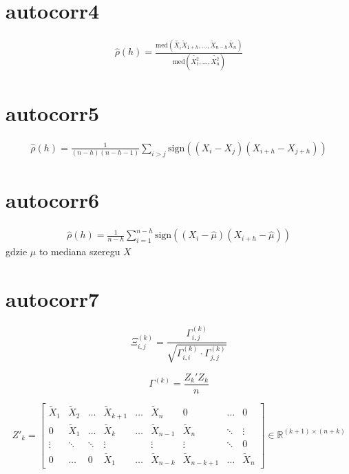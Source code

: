 \documentclass[12pt]{mwart}
\begin{document}
\section{autocorr4}
\begin{gather}
	\hat{\rho}(h)=\frac{\text{med}{\left(\tilde{X_i}\tilde{X}_{1+h},\dots, \tilde{X}_{n-h}\tilde{X_n}\right)}}{\text{med}{\left(\tilde{X_1^2},\dots, \tilde{X_n^2}\right)}}
\end{gather}
\section{autocorr5}
\begin{gather}
	\hat{\rho}(h)=\frac{1}{(n-h)(n-h-1)}\displaystyle{\sum_{i>j}\text{sign}((X_i-X_j)(X_{i+h}-X_{j+h}))}
\end{gather}
\section{autocorr6}
\begin{gather}
	\hat{\rho}(h)=\frac{1}{n-h}\displaystyle{\sum_{i=1}^{n-h}\text{sign}((X_i-\hat\mu)(X_{i+h} - \hat\mu))}
\end{gather}
gdzie $\hat\mu$ to mediana szeregu $X$
\section{autocorr7}
\begin{equation}
	\Xi_{i, j}^{(k)}=\frac{\Gamma_{i, j}^{(k)}}{\sqrt{\Gamma_{i, i}^{(k)}\cdot\Gamma_{j, j}^{(k)}}}
\end{equation}

\begin{equation}
	\Gamma^{(k)}=\frac{Z_k'Z_k}{n}
\end{equation}

\begin{equation}
	Z'_k = \begin{bmatrix}
		\tilde X_1 & \tilde X_2 & \hdots & \tilde X_{k+1}& \hdots & \tilde X_n & 0 & \hdots & 0 \\
		0 & \tilde X_1 & \hdots & \tilde X_k & \hdots &\tilde X_{n-1} & \tilde X_n & \ddots & \vdots \\
		\vdots & \ddots & \ddots & \vdots & & \vdots & \vdots & \ddots & 0 \\
		0 & \hdots & 0 & \tilde X_1 & \hdots &\tilde X_{n-k} & \tilde X_{n-k+1} & \hdots & \tilde X_n
	\end{bmatrix}\in\mathbb{R}^{(k+1)\times(n+k)}
\end{equation}
\end{document}
